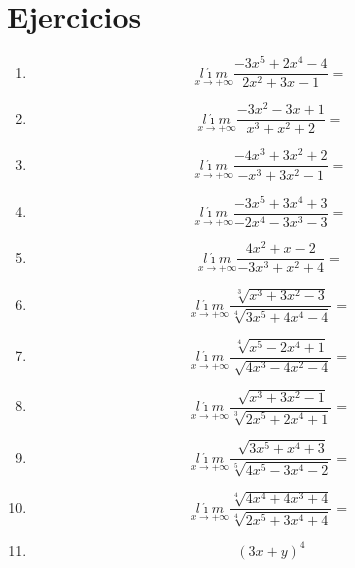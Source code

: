 \documentclass[oneside,spanish,letter]{article}
\begin{document}
\section{Ejercicios}
\begin{enumerate}
 \item $$\underset{x\rightarrow +\infty}{l\acute{\imath}m} \frac{-3x^5+2x^4-4}{2x^2+3x-1}=$$
 \item $$\underset{x\rightarrow +\infty}{l\acute{\imath}m} \frac{-3x^2-3x+1}{x^3+x^2+2}=$$
 \item $$\underset{x\rightarrow +\infty}{l\acute{\imath}m} \frac{-4x^3+3x^2+2}{-x^3+3x^2-1}=$$
 \item $$\underset{x\rightarrow +\infty}{l\acute{\imath}m} \frac{-3x^5+3x^4+3}{-2x^4-3x^3-3}=$$
 \item $$\underset{x\rightarrow +\infty}{l\acute{\imath}m} \frac{4x^2+x-2}{-3x^3+x^2+4}=$$
 \item $$\underset{x\rightarrow +\infty}{l\acute{\imath}m} \frac{\sqrt[3]{x^3+3x^2-3}}{\sqrt[4]{3x^5+4x^4-4}}=$$
 \item $$\underset{x\rightarrow +\infty}{l\acute{\imath}m} \frac{\sqrt[4]{x^5-2x^4+1}}{\sqrt[]{4x^3-4x^2-4}}=$$
 \item $$\underset{x\rightarrow +\infty}{l\acute{\imath}m} \frac{\sqrt[]{x^3+3x^2-1}}{\sqrt[3]{2x^5+2x^4+1}}=$$
 \item $$\underset{x\rightarrow +\infty}{l\acute{\imath}m} \frac{\sqrt[]{3x^5+x^4+3}}{\sqrt[5]{4x^5-3x^4-2}}=$$
 \item $$\underset{x\rightarrow +\infty}{l\acute{\imath}m} \frac{\sqrt[4]{4x^4+4x^3+4}}{\sqrt[4]{2x^5+3x^4+4}}=$$
\item $$(3x+y)^4$$
 \end{enumerate}
  \newpage
\end{document}
